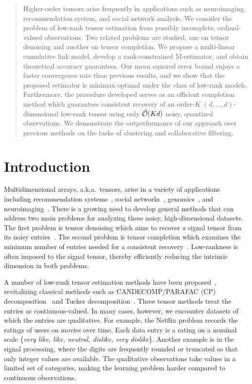 \documentclass{article}
\theoremstyle{plain}
\theoremstyle{definition}
\begin{document}
\begin{abstract}
Higher-order tensors arise frequently in applications such as neuroimaging, recommendation system, and social network analysis. We consider the problem of low-rank tensor estimation from possibly incomplete, ordinal-valued observations. Two related problems are studied, one on tensor denoising and another on tensor completion. We propose a multi-linear cumulative link model, develop a rank-constrained M-estimator, and obtain theoretical accuracy guarantees. Our mean squared error bound enjoys a faster convergence rate than previous results, and we show that the proposed estimator is minimax optimal under the class of low-rank models. Furthermore, the procedure developed serves as an efficient completion method which guarantees consistent recovery of an order-$K$ $(d,\ldots,d)$-dimensional low-rank tensor using only $\tilde {\mathcal{O}}(Kd)$ noisy, quantized observations. We demonstrate the outperformance of our approach over previous methods on the tasks of clustering and collaborative filtering.

\end{abstract}


\section{Introduction}
Multidimensional arrays, a.k.a.\ tensors, arise in a variety of applications including recommendation systems~\citep{baltrunas2011incarmusic}, social networks~\citep{nickel2011three}, genomics~\citep{wang2019three}, and neuroimaging~\citep{zhou2013tensor}. There is a growing need to develop general methods that can address two main problems for analyzing these noisy, high-dimensional datasets. The first problem is tensor denoising which aims to recover a signal tensor from its noisy entries~\citep{hong2020generalized,wang2019multiway}. The second problem is tensor completion which examines the minimum number of entries needed for a consistent recovery~\citep{ghadermarzy2018learning,montanari2018spectral}. Low-rankness is often imposed to the signal tensor, thereby efficiently reducing the intrinsic dimension in both problems.

A number of low-rank tensor estimation methods have been proposed~\citep{hong2020generalized,wang2017tensor}, revitalizing classical methods such as CANDECOMP/PARAFAC (CP) decomposition~\citep{hitchcock1927expression} and Tucker decomposition~\citep{tucker1966some}. These tensor methods treat the entries as continuous-valued. In many cases, however, we encounter datasets of which the entries are qualitative. For example, the Netflix problem records the ratings of users on movies over time. Each data entry is a rating on a nominal scale \{{\it very like, like, neutral, dislike, very dislike}\}. Another example is in the signal processing, where the digits are frequently rounded or truncated so that only integer values are available. The qualitative observations take values in a limited set of categories, making the learning problem harder compared to  continuous observations.
\end{document}
